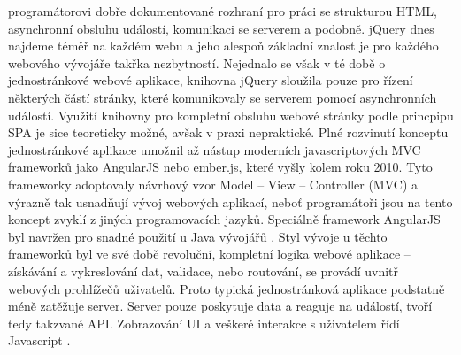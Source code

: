 programátorovi dobře dokumentované rozhraní pro práci se strukturou HTML, asynchronní obsluhu událostí, komunikaci se serverem a podobně. jQuery dnes najdeme téměř na každém webu a jeho alespoň základní znalost je pro každého webového vývojáře takřka nezbytností. Nejednalo se však v té době o jednostránkové webové aplikace, knihovna jQuery sloužila pouze pro řízení některých částí stránky, které komunikovaly se serverem pomocí asynchronních událostí. Využití knihovny pro kompletní obsluhu webové stránky podle princpipu SPA je sice teoreticky možné, avšak v praxi nepraktické. Plné rozvinutí konceptu jednostránkové aplikace umožnil až nástup moderních javascriptových MVC frameworků jako AngularJS nebo ember.js, které vyšly kolem roku 2010. Tyto frameworky adoptovaly návrhový vzor Model – View – Controller (MVC) a výrazně tak usnadňují vývoj webových aplikací, neboť programátoři jsou na tento koncept zvyklí z jiných programovacích jazyků. Speciálně framework AngularJS byl navržen pro snadné použití u Java vývojářů \cite{angular}. Styl vývoje u těchto frameworků byl ve své době revoluční, kompletní logika webové aplikace – získávání a vykreslování dat, validace, nebo routování, se provádí uvnitř webových prohlížečů uživatelů. Proto typická jednostránková aplikace podstatně méně zatěžuje server. Server pouze poskytuje data a reaguje na událostí, tvoří tedy takzvané API. Zobrazování UI a veškeré interakce s uživatelem řídí Javascript \cite{spa_horyna} \cite{spa}. 

